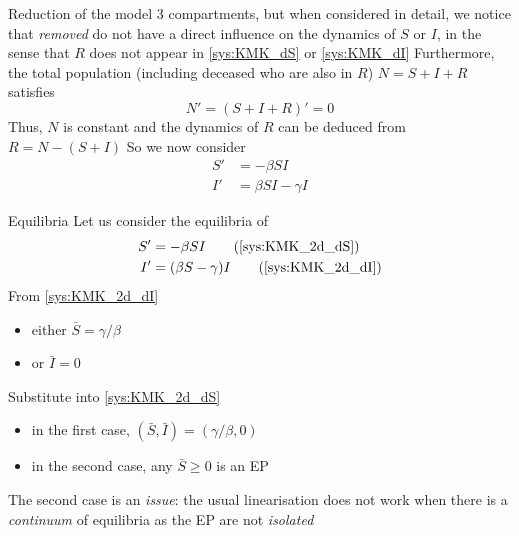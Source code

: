 \documentclass[aspectratio=43]{beamer}
\begin{document}
\begin{frame}{Reduction of the model}
  3 compartments, but when considered in detail, we notice that \emph{removed} do not have a direct influence on the dynamics of $S$ or $I$, in the sense that $R$ does not appear in \eqref{sys:KMK_dS} or \eqref{sys:KMK_dI}
  \vfill
  Furthermore, the total population (including deceased who are also in $R$) $N=S+I+R$ satisfies
  \[
  N'=(S+I+R)'=0
  \]
  Thus, $N$ is constant and the dynamics of $R$ can be deduced from $R=N-(S+I)$
  \vfill
  So we now consider
  \begin{subequations}\label{sys:KMK_2d}
    \begin{align}
      S' &= -\beta SI \label{sys:KMK_2d_dS}\\
      I' &= \beta SI-\gamma I  \label{sys:KMK_2d_dI}
      \end{align}
    \end{subequations}
\end{frame}

\begin{frame}{Equilibria}
  Let us consider the equilibria of
  \begin{subequations}
    \begin{align}
      S' &= -\beta SI 
      \tag{\ref{sys:KMK_2d_dS}} \\
      I' &= (\beta S-\gamma)I  
      \tag{\ref{sys:KMK_2d_dI}}
    \end{align}
  \end{subequations}
\vfill
  From \eqref{sys:KMK_2d_dI}
  \begin{itemize}
    \item either $\bar S=\gamma/\beta$ 
    \item or $\bar I=0$
  \end{itemize}
  \vfill
  Substitute into \eqref{sys:KMK_2d_dS}
  \begin{itemize}
    \item in the first case, $(\bar S,\bar I)=(\gamma/\beta,0)$ 
    \item in the second case, any $\bar S\geq 0$ is an EP
  \end{itemize}
  \vfill
  The second case is an \emph{issue}: the usual linearisation does not work when there is a \emph{continuum} of equilibria as the EP are not \emph{isolated}
\end{frame}
\end{document}
